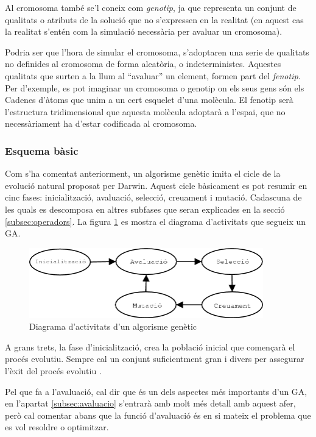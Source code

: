 Al cromosoma també se'l coneix com \emph{genotip}, ja que representa un conjunt de
qualitats o atributs de la solució que no s'expressen en la realitat (en aquest
cas la realitat s'entén com la simulació necessària per avaluar un cromosoma).

Podria ser que l'hora de simular el cromosoma, s'adoptaren una serie de
qualitats no definides al cromosoma de forma aleatòria, o indeterministes.
Aquestes qualitats que surten a la llum al ``avaluar'' un element, formen part
del \emph{fenotip}.  Per d'exemple, es pot imaginar un cromosoma o genotip on
els seus gens són els Cadenes d'àtoms que unim a un cert esquelet d'una
molècula\cite{GEB79}. El fenotip serà l'estructura tridimensional que aquesta
molècula adoptarà a l'espai, que no necessàriament ha d'estar codificada al
cromosoma.

\subsubsection{Esquema bàsic}

Com s'ha comentat anteriorment, un algorisme genètic imita el cicle de la
evolució natural proposat per Darwin. Aquest cicle bàsicament es pot resumir en
cinc fases: inicialització, avaluació, selecció, creuament i mutació. Cadascuna
de les quals es descomposa en altres subfases que seran explicades en la secció
\ref{subsec:operadors}. La figura \ref{fig:ga} es mostra el diagrama
d'activitats que segueix un GA.

\begin{figure} \centering \includegraphics[width=4in]{intro/ga}
\caption{\label{fig:ga}Diagrama d'activitats d'un algorisme genètic}
\end{figure}

A grans trets, la fase d'inicialització, crea la població inicial que començarà
el procés evolutiu. Sempre cal un conjunt suficientment gran i divers per
assegurar l'èxit del procés evolutiu \cite{G02}.

Pel que fa a l'avaluació, cal dir que és un dels aspectes més importants d'un
GA, en l'apartat \ref{subsec:avaluacio} s'entrarà amb molt més detall amb aquest
afer, però cal comentar abans que la funció d'avaluació és en si mateix el
problema que es vol resoldre o optimitzar.

